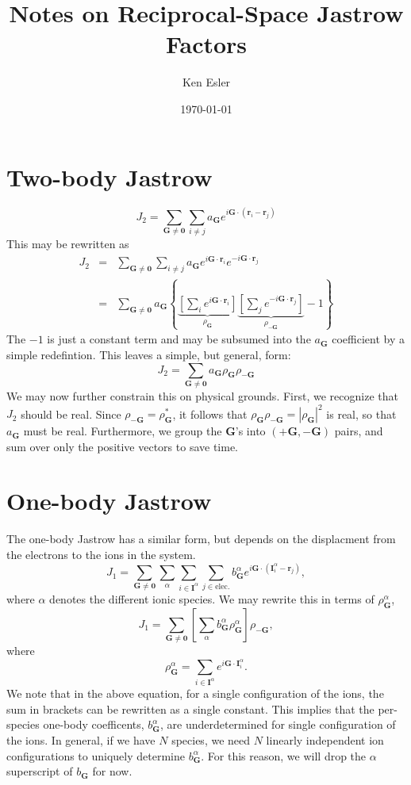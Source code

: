 \documentclass{article}
\title{Notes on Reciprocal-Space Jastrow Factors}
\date{\today}
\author{Ken Esler}
\newcommand{\vG}{\mathbf{G}}
\newcommand{\vr}{\mathbf{r}}
\newcommand{\vI}{\mathbf{I}}
\begin{document}
\maketitle
\section{Two-body Jastrow}
\begin{equation}
J_2 = \sum_{\vG\neq \mathbf{0}}\sum_{i\neq j} a_\vG e^{i\vG\cdot(\vr_i-\vr_j)}
\end{equation}
This may be rewritten as
\begin{eqnarray}
J_2 & = & \sum_{\vG\neq \mathbf{0}}\sum_{i\neq j} a_\vG e^{i\vG\cdot\vr_i}e^{-i\vG\cdot\vr_j} \\
& = & \sum_{\vG\neq \mathbf{0}} a_\vG \left\{
\underbrace{\left[\sum_i e^{i\vG\cdot\vr_i} \right]}_{\rho_\vG}
\underbrace{\left[\sum_j e^{-i\vG\cdot\vr_j} \right]}_{\rho_{-\vG}}  -1 \right\}
\end{eqnarray}
The $-1$ is just a constant term and may be subsumed into the $a_\vG$
coefficient by a simple redefintion.  This leaves a simple, but
general, form:
\begin{equation}
J_2 = \sum_{\vG\neq\mathbf{0}} a_\vG \rho_\vG \rho_{-\vG}
\end{equation}
We may now further constrain this on physical grounds.  First, we
recognize that $J_2$ should be real.  Since $\rho_{-\vG} =
\rho_\vG^*$, it follows that $\rho_{\vG}\rho_{-\vG} = |\rho_\vG|^2$ is
real, so that $a_\vG$ must be real.  Furthermore, we group the $\vG$'s
into $(+\vG, -\vG)$ pairs, and sum over only the positive vectors to
save time.

\section{One-body Jastrow}
The one-body Jastrow has a similar form, but depends on the
displacment from the electrons to the ions in the system.
\begin{equation}
J_1 = \sum_{\vG\neq\mathbf{0}} \sum_{\alpha}
\sum_{i\in\vI^\alpha}\sum_{j\in\text{elec.}} b^{\alpha}_\vG
  e^{i\vG\cdot(\vI^{\alpha}_i - \vr_j)},
\end{equation}
where $\alpha$ denotes the different ionic species.
We may rewrite this in terms of $\rho^{\alpha}_\vG$, 
\begin{equation}
J_1 = \sum_{\vG\neq\mathbf{0}} \left[\sum_\alpha b^\alpha_\vG
  \rho_\vG^\alpha\right] \rho_{-\vG},
\end{equation}
where
\begin{equation}
\rho^\alpha_\vG = \sum_{i\in\vI^\alpha} e^{i\vG\cdot\vI^\alpha_i}.
\end{equation}
We note that in the above equation, for a single configuration of the
ions, the sum in brackets can be rewritten as a single constant.  This
implies that the per-species one-body coefficents, $b^\alpha_\vG$, are
underdetermined for single configuration of the ions.  In general, if
we have $N$ species, we need $N$ linearly independent ion
configurations to uniquely determine $b^{\alpha}_\vG$.  For this
reason, we will drop the $\alpha$ superscript of $b_\vG$ for now.  
\end{document}
